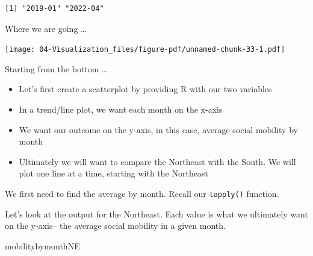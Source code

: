 \documentclass[
  letterpaper,
  DIV=11,
  numbers=noendperiod]{scrreprt}
\newenvironment{Shaded}{\begin{snugshade}}{\end{snugshade}}
\newcommand{\AttributeTok}[1]{\textcolor[rgb]{0.40,0.45,0.13}{#1}}
\newcommand{\FunctionTok}[1]{\textcolor[rgb]{0.28,0.35,0.67}{#1}}
\newcommand{\NormalTok}[1]{\textcolor[rgb]{0.00,0.23,0.31}{#1}}
\newcommand{\OtherTok}[1]{\textcolor[rgb]{0.00,0.23,0.31}{#1}}
\newcommand{\SpecialCharTok}[1]{\textcolor[rgb]{0.37,0.37,0.37}{#1}}
\providecommand{\tightlist}{%
  \setlength{\itemsep}{0pt}\setlength{\parskip}{0pt}}\usepackage{longtable,booktabs,array}
\begin{document}
\begin{verbatim}
[1] "2019-01" "2022-04"
\end{verbatim}

Where we are going \ldots{}

\texttt{[image: 04-Visualization\_files/figure-pdf/unnamed-chunk-33-1.pdf]}

Starting from the bottom \ldots{}

\begin{itemize}
\tightlist
\item
  Let's first create a scatterplot by providing R with our two variables
\item
  In a trend/line plot, we want each month on the x-axis
\item
  We want our outcome on the y-axis, in this case, average social
  mobility by month
\item
  Ultimately we will want to compare the Northeast with the South. We
  will plot one line at a time, starting with the Northeast
\end{itemize}

We first need to find the average by month. Recall our \texttt{tapply()}
function.

\begin{Shaded}
\end{Shaded}

Let's look at the output for the Northeast. Each value is what we
ultimately want on the y-axis-- the average social mobility in a given
month.

\begin{Shaded}
\begin{Highlighting}[]
\NormalTok{mobilitybymonthNE}
\end{Highlighting}
\end{Shaded}
\end{document}
